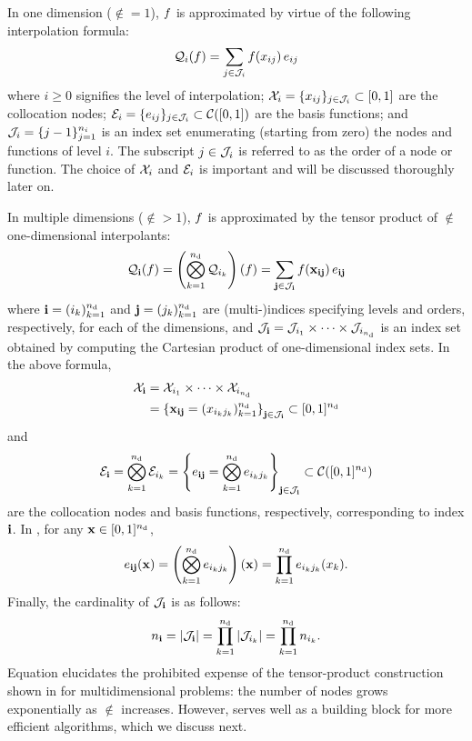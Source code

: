 In one dimension ($\nin = 1$), $f$ is approximated by virtue of the following
interpolation formula:
\begin{equation} \elab{tensor-1d}
  \tensor{i}(\f) = \sum_{j \in \oindex_i} \f(\x_{ij}) \, \e_{ij}
\end{equation}
where $i \geq 0$ signifies the level of interpolation; $\mathcal{X}_i = \{ x_{ij} \}_{j
\in \mathcal{J}_i} \subset [0, 1]$ are the collocation nodes; $\mathcal{E}_i = \{ e_{ij}
\}_{j \in \mathcal{J}_i} \subset \mathcal{C}([0, 1])$ are the basis functions; and
$\mathcal{J}_i = \{ j - 1 \}_{j = 1}^{n_i}$ is an index set enumerating (starting
from zero) the nodes and functions of level $i$. The subscript $j \in \mathcal{J}_i$
is referred to as the order of a node or function. The choice of $\mathcal{X}_i$ and
$\mathcal{E}_i$ is important and will be discussed thoroughly later on.

In multiple dimensions ($\nin > 1$), $f$ is approximated by the tensor product
of $\nin$ one-dimensional interpolants:
\begin{equation} \elab{tensor-nd}
  \tensor{\vi}(\f) = \left( \bigotimes_{k = 1}^\nin \tensor{i_k} \right)(\f) = \sum_{\vj \in \oindex_\vi} \f(\vx_{\vi\vj}) \, \e_{\vi\vj}
\end{equation}
where $\mathbf{i} = (i_k)_{k = 1}^{n_\text{d}}$ and $\mathbf{j} = (j_k)_{k = 1}^{n_\text{d}}$ are
(multi-)indices specifying levels and orders, respectively, for each of the
dimensions, and $\mathcal{J}_{\mathbf{i}} = \mathcal{J}_{i_1} \times \cdots \times
\mathcal{J}_{i_{n_\text{d}}}$ is an index set obtained by computing the Cartesian product of
one-dimensional index sets. In the above formula,
\begin{align}
  \X_\vi &= \X_{i_1} \times \cdots \times \X_{i_\nin} \elab{collocation-nodes} \\
         &= \left\{ \vx_{\vi\vj} = (\x_{i_k j_k})_{k = 1}^\nin \right\}_{\vj \in \oindex_\vi} \subset [0, 1]^\nin \nonumber
\end{align}
and
\begin{equation} \elab{basis-functions}
  \E_\vi = \bigotimes_{k = 1}^\nin \E_{i_k}
         = \left\{ \e_{\vi\vj} = \bigotimes_{k = 1}^\nin \e_{i_k j_k} \right\}_{\vj \in \oindex_\vi} \subset \continuous([0, 1]^\nin)
\end{equation}
are the collocation nodes and basis functions, respectively, corresponding to
index $\mathbf{i}$. In , for any $\mathbf{x} \in [0, 1]^{n_\text{d}}$,
\begin{equation} \elab{basis-function}
  \e_{\vi\vj}(\vx) = \left( \bigotimes_{k = 1}^\nin \e_{i_k j_k} \right)(\vx) = \prod_{k = 1}^\nin \e_{i_k j_k}(\x_k).
\end{equation}
Finally, the cardinality of $\mathcal{J}_{\mathbf{i}}$ is as follows:
\begin{equation} \elab{tensor-cardinality}
  \n_\vi = \card{\oindex_\vi} = \prod_{k = 1}^\nin \card{\oindex_{i_k}} = \prod_{k = 1}^\nin \n_{i_k}.
\end{equation}
Equation  elucidates the prohibited expense of the
tensor-product construction shown in  for multidimensional
problems: the number of nodes grows exponentially as $\nin$ increases. However,
 serves well as a building block for more efficient algorithms,
which we discuss next.

